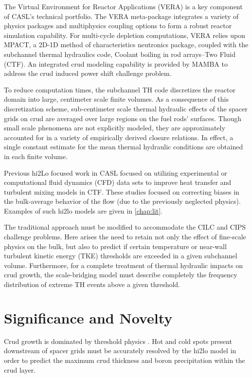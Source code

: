 The Virtual Environment for Reactor Applications (VERA) is a key component of
CASL's technical portfolio.  The VERA meta-package integrates a variety of physics
packages and multiphysics coupling options to form a robust reactor simulation
capability.  For multi-cycle depletion computations, VERA relies upon MPACT, a
2D-1D method of characteristics neutronics package, coupled with the subchannel
thermal hydraulics code, Coolant boiling in rod arrays–Two Fluid (CTF).   
An integrated crud modeling capability
is provided by MAMBA to address the crud induced power shift challenge problem.

To reduce computation times, the subchannel TH code discretizes the reactor
domain into large, centimeter scale finite volumes. As a consequence of this
discretization scheme, sub-centimeter scale thermal hydraulic effects of the
spacer grids on crud are averaged over large regions on the fuel rods'
surfaces.  Though small scale phenomena are not explicitly modeled, they are
approximately accounted for in a variety of empirically derived closure
relations.  In effect, a single constant estimate for the mean thermal
hydraulic conditions are obtained in each finite volume.
 

Previous hi2Lo focused work in CASL focused on utilizing experimental or computational fluid dynamics (CFD) data sets to improve heat transfer and turbulent mixing models in CTF.  These studies focused on
correcting biases in the bulk-average behavior of the flow (due to the
previously neglected physics).  Examples of such hi2lo models are given in
\autoref{chap:lit}.

The traditional approach must be modified to accommodate the CILC and CIPS
challenge problems.  Here arises the need to retain not only the effect of
fine-scale physics on the bulk, but also to predict if certain temperature or
near-wall turbulent kinetic energy (TKE) thresholds are exceeded in a given subchannel volume.  Furthermore, for a
complete treatment of thermal hydraulic impacts on crud growth, the
scale-bridging model must describe completely the frequency distribution of
extreme TH events above a given threshold.


\section{Significance and Novelty}

Crud growth is dominated by threshold physics \cite{mongoose17}.  Hot and cold spots
present downstream of spacer grids must be accurately resolved by the hi2lo model
in order to predict the maximum crud
thickness and boron precipitation within the crud layer.

